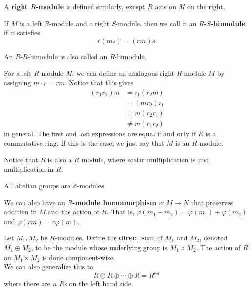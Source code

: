 \begin{df}
A \textbf{right $R$-module} is defined similarly, except $R$ acts on $M$
on the right.
\end{df}

\begin{df}
If $M$ is a left $R$-module and a right $S$-module, then we call it an
\textbf{$R$-$S$-bimodule} if it satisfies
\[ r\left(ms\right) = \left(rm\right)s. \]
\end{df}
\begin{rem}
An $R$-$R$-bimodule is also called an $R$-bimodule.
\end{rem}

\begin{rem}
For a left $R$-module $M$, we can define an analogous right $R$-module
$M$ by assigning $m \cdot r = rm$. Notice that this gives
\[ \begin{aligned}
\left(r_1 r_2\right) m &= r_1 \left(r_2 m\right) \\
&= \left(m r_2\right) r_1 \\
&= m \left(r_2 r_1\right) \\
&\neq m \left(r_1 r_2\right)
\end{aligned} \]
in general. The first and last expressions are equal if and only if $R$
is a commutative ring. If this is the case, we just say that $M$ is an
$R$-module.
\end{rem}
\begin{rem}
Notice that $R$ is also a $R$ module, where scalar multiplication is
just multiplication in $R$.
\end{rem}

\begin{cor}
All abelian groups are $\mathbb{Z}$-modules.
\end{cor}

\begin{df}
We can also have an \textbf{$R$-module homomorphism} $\varphi : M
\rightarrow N$ that preserves addition in $M$ and the action of $R$.
That is, $\varphi(m_1 + m_2) = \varphi(m_1) + \varphi(m_2)$ and
$\varphi(rm) = r \varphi(m)$.
\end{df}

\begin{df}
Let $M_1, M_2$ be $R$-modules. Define the \textbf{direct su}m of $M_1$
and $M_2$, denoted $M_1 \oplus M_2$, to be the module whose underlying
group is $M_1 \times M_2$. The action of $R$ on $M_1 \times M_2$ is done
component-wise. \\
We can also generalize this to
\[ R \oplus R \oplus \cdots \oplus R = R^{\oplus n} \]
where there are $n$ $R$s on the left hand side.
\end{df}

